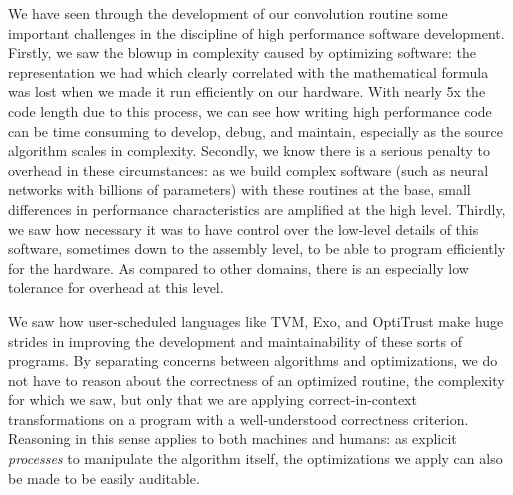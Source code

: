 \documentclass[acmsmall, nonacm=true]{acmart}
\begin{document}
We have seen through the development of our convolution routine some important challenges in the discipline of high performance software development. Firstly, we saw the blowup in complexity caused by optimizing software: the representation we had which clearly correlated with the mathematical formula was lost when we made it run efficiently on our hardware. With nearly 5x the code length due to this process, we can see how writing high performance code can be time consuming to develop, debug, and maintain, especially as the source algorithm scales in complexity. Secondly, we know there is a serious penalty to overhead in these circumstances: as we build complex software (such as neural networks with billions of parameters) with these routines at the base, small differences in performance characteristics are amplified at the high level. Thirdly, we saw how necessary it was to have control over the low-level details of this software, sometimes down to the assembly level, to be able to program efficiently for the hardware. As compared to other domains, there is an especially low tolerance for overhead at this level.

We saw how user-scheduled languages like TVM, Exo, and OptiTrust make huge strides in improving the development and maintainability of these sorts of programs. By separating concerns between algorithms and optimizations, we do not have to reason about the correctness of an optimized routine, the complexity for which we saw, but only that we are applying correct-in-context transformations on a program with a well-understood correctness criterion. Reasoning in this sense applies to both machines and humans: as explicit \textit{processes} to manipulate the algorithm itself, the optimizations we apply can also be made to be easily auditable. 
\end{document}
